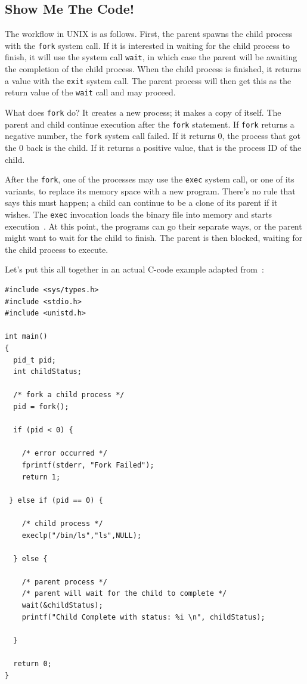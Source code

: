 \subsection*{Show Me The Code!}

The workflow in UNIX is as follows. First, the parent spawns the child process with the \texttt{fork} system call. If it is interested in waiting for the child process to finish, it will use the system call \texttt{wait}, in which case the parent will be awaiting the completion of the child process. When the child process is finished, it returns a value with the \texttt{exit} system call. The parent process will then get this as the return value of the \texttt{wait} call and may proceed.

What does \texttt{fork} do? It creates a new process; it makes a copy of itself. The parent and child continue execution after the \texttt{fork} statement. If \texttt{fork} returns a negative number, the \texttt{fork} system call failed. If it returns 0, the process that got the 0 back is the child. If it returns a positive value, that is the process ID of the child.

After the \texttt{fork}, one of the processes may use the \texttt{exec} system call, or one of its variants, to replace its memory space with a new program. There's no rule that says this must happen; a child can continue to be a clone of its parent if it wishes. The \texttt{exec} invocation loads the binary file into memory and starts execution~\cite{osc}. At this point, the programs can go their separate ways, or the parent might want to wait for the child to finish. The parent is then blocked, waiting for the child process to execute.

Let's put this all together in an actual C-code example adapted from~\cite{osc}:

\begin{verbatim}
#include <sys/types.h>
#include <stdio.h> 
#include <unistd.h>

int main()
{
  pid_t pid;
  int childStatus;

  /* fork a child process */
  pid = fork();
  
  if (pid < 0) { 
  
    /* error occurred */ 
    fprintf(stderr, "Fork Failed"); 
    return 1;
    
 } else if (pid == 0) { 
    
    /* child process */
    execlp("/bin/ls","ls",NULL);
    
  } else { 
    
    /* parent process */
    /* parent will wait for the child to complete */
    wait(&childStatus);
    printf("Child Complete with status: %i \n", childStatus);
    
  }
    
  return 0;
}
\end{verbatim}

